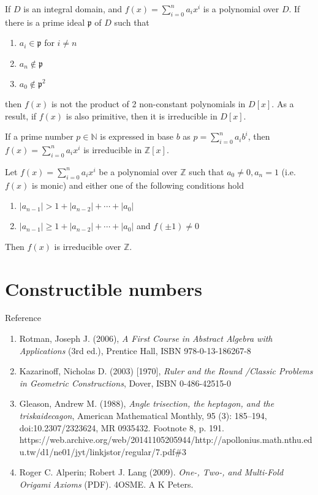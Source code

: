 \documentclass{treatise}
\begin{document}
\begin{shaded}
\begin{theorem}
If $D$ is an integral domain, and $f(x) = \sum_{i = 0}^n a_i x^i$ is a polynomial over $D$. If there is a prime ideal $\mathfrak{p}$ of $D$ such that
\begin{enumerate}
	\item $a_i \in \mathfrak{p}$ for $i \neq n$
	\item $a_n \notin \mathfrak{p}$
	\item $a_0 \notin \mathfrak{p}^2$
\end{enumerate}
then $f(x)$ is not the product of 2 non-constant polynomials in $D[x]$. As a result, if $f(x)$ is also primitive, then it is irreducible in $D[x]$.
\end{theorem}
\begin{theorem}
If a prime number $p \in \mathbb{N}$ is expressed in base $b$ as $p = \sum_{i = 0}^n a_i b^i$, then $f(x) = \sum_{i = 0}^n a_i x^i$ is irreducible in $\mathbb{Z}[x]$.
\end{theorem}
\begin{theorem}
Let $f(x) = \sum_{i = 0}^n a_i x^i$ be a polynomial over $\mathbb{Z}$ such that $a_0 \neq 0, a_n = 1$ (i.e. $f(x)$ is monic) and either one of the following conditions hold
\begin{enumerate}
	\item $|a_{n - 1}| > 1 + |a_{n - 2}| + \cdots + |a_0|$
	\item $|a_{n - 1}| \geq 1 + |a_{n - 2}| + \cdots + |a_0|$ and $f(\pm 1) \neq 0$
\end{enumerate}
Then $f(x)$ is irreducible over $\mathbb{Z}$.
\end{theorem}

\section{Constructible numbers}
Reference
\begin{enumerate}
	\item Rotman, Joseph J. (2006), \textit{A First Course in Abstract Algebra with Applications} (3rd ed.), Prentice Hall, ISBN 978-0-13-186267-8
	\item Kazarinoff, Nicholas D. (2003) [1970], \textit{Ruler and the Round /Classic Problems in Geometric Constructions}, Dover, ISBN 0-486-42515-0
	\item Gleason, Andrew M. (1988), \textit{Angle trisection, the heptagon, and the triskaidecagon}, American Mathematical Monthly, 95 (3): 185–194, doi:10.2307/2323624, MR 0935432. Footnote 8, p. 191. https://web.archive.org/web/20141105205944/http://apollonius.math.nthu.edu.tw/d1/ne01/jyt/linkjstor/regular/7.pdf\#3
	\item Roger C. Alperin; Robert J. Lang (2009). \textit{One-, Two-, and Multi-Fold Origami Axioms} (PDF). 4OSME. A K Peters.
\end{enumerate}


\end{shaded}
\end{document}
